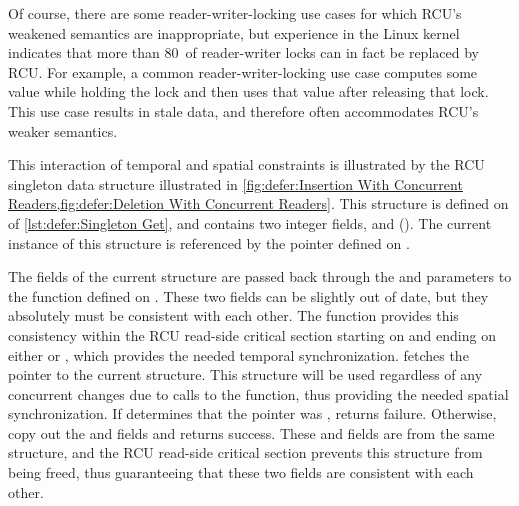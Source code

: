 Of course, there are some reader-writer-locking use cases for which
RCU's weakened semantics are inappropriate, but experience in the Linux
kernel indicates that more than 80\pct\ of reader-writer locks can in fact
be replaced by RCU\@.
For example, a common reader-writer-locking use case computes some value
while holding the lock and then uses that value after releasing that lock.
This use case results in stale data, and therefore often accommodates
RCU's weaker semantics.

\begin{listing}

\caption{RCU Singleton Get}
\label{lst:defer:Singleton Get}
\end{listing}

\begin{listing}

\caption{RCU Singleton Set}
\label{lst:defer:Singleton Set}
\end{listing}

\begin{fcvref}
This interaction of temporal and spatial constraints is illustrated
by the RCU singleton data structure illustrated in
\cref{fig:defer:Insertion With Concurrent Readers,fig:defer:Deletion With Concurrent Readers}.
This structure is defined on  of
\cref{lst:defer:Singleton Get}, and contains two integer fields,
 and  ().
The current instance of this structure is referenced by the 
pointer defined on .
\end{fcvref}

\begin{fcvref}
The fields of the current structure are passed back through the
 and  parameters to the  function
defined on .
These two fields can be slightly out of date, but they absolutely must
be consistent with each other.
The  function provides this consistency
within the RCU read-side critical section starting on
 and ending on either  or ,
which provides the needed temporal synchronization.
 fetches the pointer to the current  structure.
This structure will be used regardless of any concurrent changes due
to calls to the  function, thus providing the needed
spatial synchronization.
If  determines that the  pointer was
,  returns failure.
Otherwise,  copy out the  and  fields
and  returns success.
These  and  fields are from the same 
structure, and the RCU read-side critical section prevents this structure
from being freed, thus guaranteeing that these two fields are consistent
with each other.
\end{fcvref}

